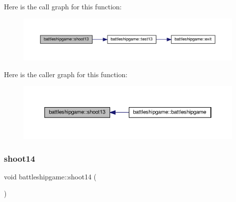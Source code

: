 Here is the call graph for this function\+:
\nopagebreak
\begin{figure}[H]
\begin{center}
\leavevmode
\includegraphics[width=350pt]{classbattleshipgame_a51fcb1716e0ad6cebc777c14a76c9f50_cgraph}
\end{center}
\end{figure}
Here is the caller graph for this function\+:
\nopagebreak
\begin{figure}[H]
\begin{center}
\leavevmode
\includegraphics[width=350pt]{classbattleshipgame_a51fcb1716e0ad6cebc777c14a76c9f50_icgraph}
\end{center}
\end{figure}
\mbox{\label{classbattleshipgame_a2e1f24999099b5c301253a244d46c663}} 
\subsubsection{\texorpdfstring{shoot14}{shoot14}}
{\footnotesize\ttfamily void battleshipgame\+::shoot14 (\begin{DoxyParamCaption}{ }\end{DoxyParamCaption})\hspace{0.3cm}{\ttfamily [slot]}}

